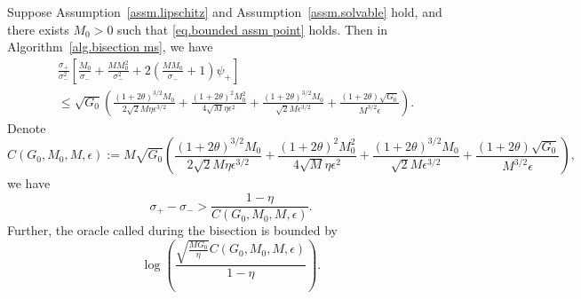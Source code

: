 \documentclass{mcom-l}
\numberwithin{equation}{section}
\begin{document}
\begin{corollary}
    \label{coro.bisection bound}
    Suppose Assumption~\ref{assm.lipschitz} and Assumption~\ref{assm.solvable} hold, and there exists $M_0>0$ such that \eqref{eq.bounded assm point} holds. Then in Algorithm~\ref{alg.bisection ms}, we have
    \begin{equation*}
        \begin{aligned}
             & \frac{\sigma_+}{\sigma_-^2}\left[\frac{M_0}{\sigma_-}+\frac{MM_0^2}{\sigma_-^2}+2\left(\frac{MM_0}{\sigma_-}+1\right)\psi_+
            \right]                                                                                                                                                                                                                                          \\
             & \leq \sqrt{G_0}\left(\frac{(1+2\theta)^{3/2}M_0}{2\sqrt{2}M\eta \epsilon^{3/2}}+\frac{(1+2\theta)^2M_0^2}{4\sqrt{M}\eta\epsilon^2}+\frac{(1+2\theta)^{3/2}M_0}{\sqrt{2}M\epsilon^{3/2}}+\frac{(1+2\theta)\sqrt{G_0}}{M^{3/2}\epsilon}\right).
        \end{aligned}
    \end{equation*}
    Denote
    $$C(G_0,M_0,M,\epsilon):= M\sqrt{G_0}\left(\frac{(1+2\theta)^{3/2}M_0}{2\sqrt{2}M\eta \epsilon^{3/2}}+\frac{(1+2\theta)^2M_0^2}{4\sqrt{M}\eta\epsilon^2}+\frac{(1+2\theta)^{3/2}M_0}{\sqrt{2}M\epsilon^{3/2}}+\frac{(1+2\theta)\sqrt{G_0}}{M^{3/2}\epsilon}\right),$$
    we have
    \begin{equation}
        \label{eq.bound value by brackets}
        \sigma_+-\sigma_->\frac{1-\eta}{C(G_0,M_0,M,\epsilon)}.
    \end{equation}
    Further, the oracle called during the bisection is bounded by
    \begin{equation*}
        \log \left(\frac{\sqrt{\frac{MG_0}{\eta}}C(G_0,M_0,M,\epsilon)}{1-\eta}\right).
    \end{equation*}
\end{corollary}
\end{document}
